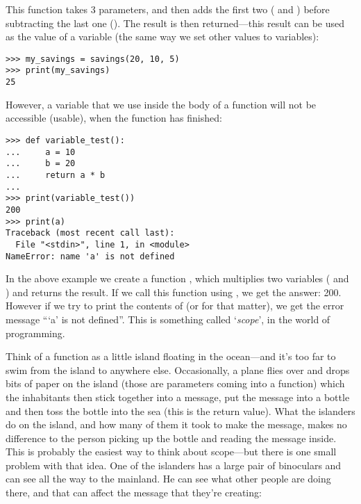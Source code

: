 This function takes 3 parameters, and then adds the first two ( and ) before subtracting the last one ().  The result is then returned---this result can be used as the value of a variable (the same way we set other values to variables):

\begin{listing}
\begin{verbatim}
>>> my_savings = savings(20, 10, 5)
>>> print(my_savings)
25
\end{verbatim}
\end{listing}

\noindent
However, a variable that we use inside the body of a function will not be accessible (usable), when the function has finished:

\begin{listing}
\begin{verbatim}
>>> def variable_test():
...     a = 10
...     b = 20
...     return a * b
...
>>> print(variable_test())
200
>>> print(a)
Traceback (most recent call last):
  File "<stdin>", line 1, in <module>
NameError: name 'a' is not defined
\end{verbatim}
\end{listing} 

In the above example we create a function , which multiplies two variables ( and ) and returns the result.  If we call this function using , we get the answer: 200.  However if we try to print the contents of  (or  for that matter), we get the error message ```a' is not defined''. This is something called `\emph{scope}', in the world of programming.
\par
Think of a function as a little island floating in the ocean---and it's too far to swim from the island to anywhere else.  Occasionally, a plane flies over and drops bits of paper on the island (those are parameters coming into a function) which the inhabitants then stick together into a message, put the message into a bottle and then toss the bottle into the sea (this is the return value).  What the islanders do on the island, and how many of them it took to make the message, makes no difference to the person picking up the bottle and reading the message inside.  This is probably the easiest way to think about scope---but there is one small problem with that idea.  One of the islanders has a large pair of binoculars and can see all the way to the mainland.  He can see what other people are doing there, and that can affect the message that they're creating:

